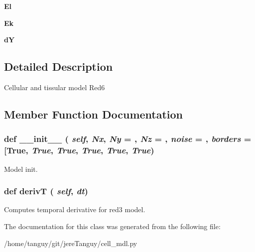 \begin{DoxyCompactItemize}
\item 
\hypertarget{classcell__mdl_1_1_red6_a5f34de0b936acd806815dccdd70a8766}{
{\bfseries El}}
\label{classcell__mdl_1_1_red6_a5f34de0b936acd806815dccdd70a8766}

\item 
\hypertarget{classcell__mdl_1_1_red6_acbf7f480b7d4d43df681879f7cccbd77}{
{\bfseries Ek}}
\label{classcell__mdl_1_1_red6_acbf7f480b7d4d43df681879f7cccbd77}

\item 
\hypertarget{classcell__mdl_1_1_red6_a90011e7d69aec5376e286b72ae9e0730}{
{\bfseries dY}}
\label{classcell__mdl_1_1_red6_a90011e7d69aec5376e286b72ae9e0730}

\end{DoxyCompactItemize}


\subsection{Detailed Description}
\begin{DoxyVerb}Cellular and tissular model Red6\end{DoxyVerb}
 

\subsection{Member Function Documentation}
\hypertarget{classcell__mdl_1_1_red6_ac775ee34451fdfa742b318538164070e}{
\subsubsection[{\_\-\_\-init\_\-\_\-}]{\setlength{\rightskip}{0pt plus 5cm}def \_\-\_\-init\_\-\_\- ( {\em self}, \/   {\em Nx}, \/   {\em Ny} = {}, \/   {\em Nz} = {}, \/   {\em noise} = {}, \/   {\em borders} = {\ttfamily \mbox{[}True}, \/   {\em True}, \/   {\em True}, \/   {\em True}, \/   {\em True}, \/   {\em True})}}
\label{classcell__mdl_1_1_red6_ac775ee34451fdfa742b318538164070e}
\begin{DoxyVerb}Model init.\end{DoxyVerb}
 \hypertarget{classcell__mdl_1_1_red6_ad67701a6bb599a16a9eb386aa1cd4328}{
\subsubsection[{derivT}]{\setlength{\rightskip}{0pt plus 5cm}def derivT ( {\em self}, \/   {\em dt})}}
\label{classcell__mdl_1_1_red6_ad67701a6bb599a16a9eb386aa1cd4328}
\begin{DoxyVerb}Computes temporal derivative for red3 model.\end{DoxyVerb}
 

The documentation for this class was generated from the following file:\begin{DoxyCompactItemize}
\item 
/home/tanguy/git/jereTanguy/cell\_\-mdl.py\end{DoxyCompactItemize}
